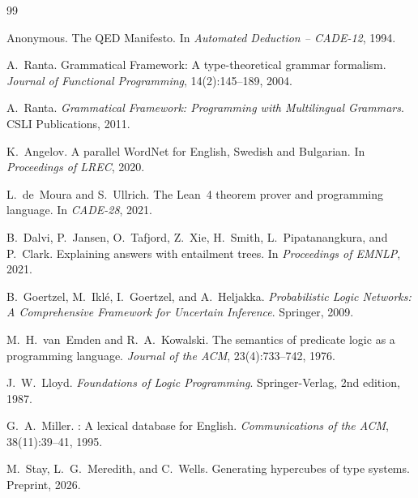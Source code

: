 \documentclass[]{article}
\begin{document}
\begin{thebibliography}{99}

Anonymous.
\newblock The {QED} Manifesto.
\newblock In \emph{Automated Deduction -- CADE-12}, 1994.

A.~Ranta.
\newblock Grammatical Framework: A type-theoretical grammar formalism.
\newblock \emph{Journal of Functional Programming}, 14(2):145--189, 2004.

A.~Ranta.
\newblock \emph{Grammatical Framework: Programming with Multilingual Grammars}.
\newblock CSLI Publications, 2011.

K.~Angelov.
\newblock A parallel {WordNet} for {English}, {Swedish} and {Bulgarian}.
\newblock In \emph{Proceedings of LREC}, 2020.

L.~de~Moura and S.~Ullrich.
\newblock The {Lean}~4 theorem prover and programming language.
\newblock In \emph{CADE-28}, 2021.

B.~Dalvi, P.~Jansen, O.~Tafjord, Z.~Xie, H.~Smith, L.~Pipatanangkura, and P.~Clark.
\newblock Explaining answers with entailment trees.
\newblock In \emph{Proceedings of EMNLP}, 2021.

B.~Goertzel, M.~Ikl{\'e}, I.~Goertzel, and A.~Heljakka.
\newblock \emph{Probabilistic Logic Networks: A Comprehensive Framework for
  Uncertain Inference}.
\newblock Springer, 2009.

M.~H.~van~Emden and R.~A.~Kowalski.
\newblock The semantics of predicate logic as a programming language.
\newblock \emph{Journal of the ACM}, 23(4):733--742, 1976.

J.~W.~Lloyd.
\newblock \emph{Foundations of Logic Programming}.
\newblock Springer-Verlag, 2nd edition, 1987.

G.~A.~Miller.
: A lexical database for {English}.
\newblock \emph{Communications of the ACM}, 38(11):39--41, 1995.

M.~Stay, L.~G.~Meredith, and C.~Wells.
\newblock Generating hypercubes of type systems.
\newblock Preprint, 2026.

\end{thebibliography}
\end{document}
